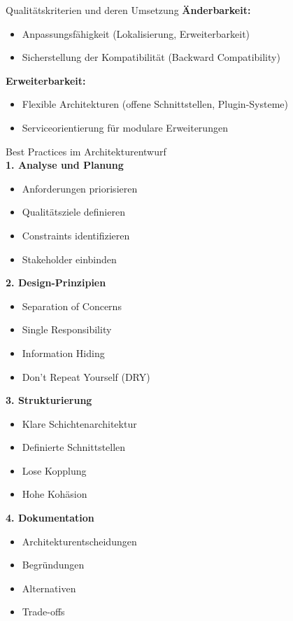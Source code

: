 \begin{corollary}{Qualitätskriterien und deren Umsetzung}
\textbf{Änderbarkeit:}
\begin{itemize}
    \item Anpassungsfähigkeit (Lokalisierung, Erweiterbarkeit)
    \item Sicherstellung der Kompatibilität (Backward Compatibility)
\end{itemize}

\textbf{Erweiterbarkeit:}
\begin{itemize}
    \item Flexible Architekturen (offene Schnittstellen, Plugin-Systeme)
    \item Serviceorientierung für modulare Erweiterungen
\end{itemize}
\end{corollary}

\begin{KR}{Best Practices im Architekturentwurf}\\
\textbf{1. Analyse und Planung}
\begin{itemize}
    \item Anforderungen priorisieren
    \item Qualitätsziele definieren
    \item Constraints identifizieren
    \item Stakeholder einbinden
\end{itemize}

\textbf{2. Design-Prinzipien}
\begin{itemize}
    \item Separation of Concerns
    \item Single Responsibility
    \item Information Hiding
    \item Don't Repeat Yourself (DRY)
\end{itemize}

\textbf{3. Strukturierung}
\begin{itemize}
    \item Klare Schichtenarchitektur
    \item Definierte Schnittstellen
    \item Lose Kopplung
    \item Hohe Kohäsion
\end{itemize}

\textbf{4. Dokumentation}
\begin{itemize}
    \item Architekturentscheidungen
    \item Begründungen
    \item Alternativen
    \item Trade-offs
\end{itemize}
\end{KR}


